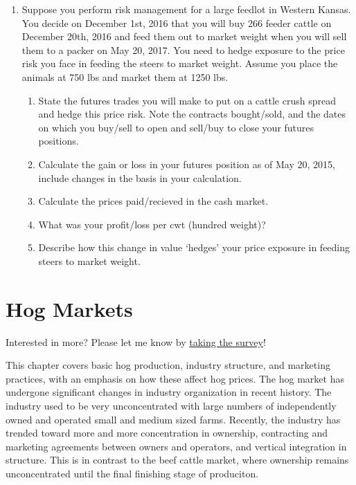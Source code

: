 \documentclass[
  letterpaper,
  DIV=11,
  numbers=noendperiod]{scrreprt}
\providecommand{\tightlist}{%
  \setlength{\itemsep}{0pt}\setlength{\parskip}{0pt}}\usepackage{longtable,booktabs,array}
\begin{document}
\begin{enumerate}
\def\labelenumi{\arabic{enumi}.}
\item
  Suppose you perform risk management for a large feedlot in Western
  Kansas. You decide on December 1st, 2016 that you will buy 266 feeder
  cattle on December 20th, 2016 and feed them out to market weight when
  you will sell them to a packer on May 20, 2017. You need to hedge
  exposure to the price risk you face in feeding the steers to market
  weight. Assume you place the animals at 750 lbs and market them at
  1250 lbs.

  \begin{enumerate}
  \def\labelenumii{\alph{enumii}.}
  \tightlist
  \item
    State the futures trades you will make to put on a cattle crush
    spread and hedge this price risk. Note the contracts bought/sold,
    and the dates on which you buy/sell to open and sell/buy to close
    your futures positions.
  \item
    Calculate the gain or loss in your futures position as of May 20,
    2015, include changes in the basis in your calculation.
  \item
    Calculate the prices paid/recieved in the cash market.
  \item
    What was your profit/loss per cwt (hundred weight)?
  \item
    Describe how this change in value `hedges' your price exposure in
    feeding steers to market weight.
  \end{enumerate}
\end{enumerate}


\hypertarget{hog-markets}{%
\chapter{Hog Markets}\label{hog-markets}}

{Interested in more? Please let me know by}
\href{https://forms.gle/Q3VByCQZHjfQSy9D7}{taking the survey}!

This chapter covers basic hog production, industry structure, and
marketing practices, with an emphasis on how these affect hog prices.
The hog market has undergone significant changes in industry
organization in recent history. The industry used to be very
unconcentrated with large numbers of independently owned and operated
small and medium sized farms. Recently, the industry has trended toward
more and more concentration in ownership, contracting and marketing
agreements between owners and operators, and vertical integration in
structure. This is in contrast to the beef cattle market, where
ownership remains unconcentrated until the final finishing stage of
produciton.
\end{document}
